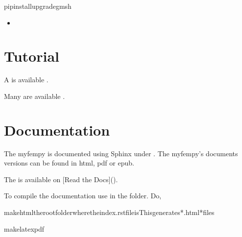 \documentclass[letterpaper,10pt,english]{sphinxmanual}
\begin{document}
\begin{sphinxVerbatim}[commandchars=\\\{\}]
\PYGZgt{}\PYGZgt{}pipinstall\PYGZhy{}\PYGZhy{}upgradegmsh
\end{sphinxVerbatim}
\begin{itemize}
\item {} 
\sphinxAtStartPar
{}

\end{itemize}


\chapter{Tutorial}
\label{\detokenize{index:tutorial}}
\sphinxAtStartPar
A  is available
.

\sphinxAtStartPar
Many  are available
.


\chapter{Documentation}
\label{\detokenize{index:documentation}}
\sphinxAtStartPar
The myfempy is documented using Sphinx under . The myfempy’s documents versions can be found in html, pdf or epub.

\sphinxAtStartPar
The  is available on {[}Read the Docs{]}().

\sphinxAtStartPar
To compile the documentation use  in the  folder. Do,

\begin{sphinxVerbatim}[commandchars=\\\{\}]
\PYGZgt{}\PYGZgt{}makehtmltherootfolderwheretheindex.rstfileis\PYGZhy{}\PYGZhy{}\PYGZgt{}Thisgenerates*.html*files

\PYGZgt{}\PYGZgt{}makelatexpdf
\end{sphinxVerbatim}
\end{document}
